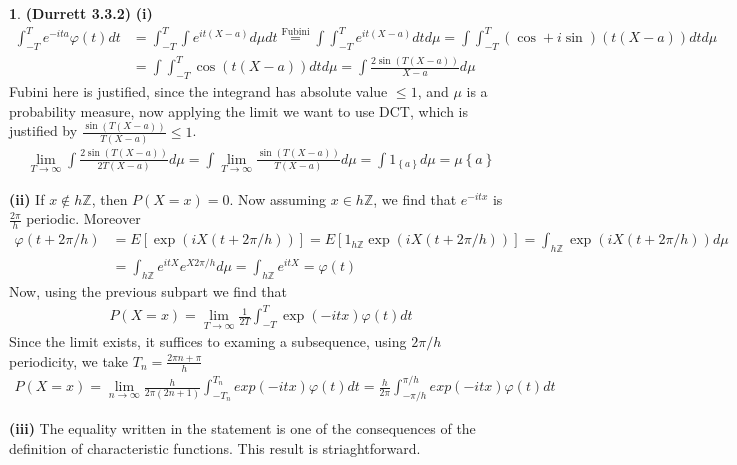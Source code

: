 \documentclass{article}
\theoremstyle{definition}
\newtheorem{pb}{}
\newcommand{\set}[1]{\left\{#1\right\}}
\begin{document}
    \begin{pb}\textbf{(Durrett 3.3.2)} \textbf{(i)}
        \begin{align*}
            \int_{-T}^T e^{-ita}\varphi(t)dt &= \int_{-T}^T \int e^{it(X-a)}d\mu dt \overset{\text{Fubini}}{=} \int\int_{-T}^T e^{it(X-a)}dtd\mu = \int\int_{-T}^T (\cos + i\sin)(t(X-a))dtd\mu \\
            &= \int\int_{-T}^T \cos(t(X-a))dtd\mu = \int \frac{2\sin(T(X-a))}{X-a}d\mu
        \end{align*}
        Fubini here is justified, since the integrand has absolute value \(\leq 1\), and \(\mu\) is a probability measure, now applying the limit we want to use DCT, which is justified by \(\frac{\sin(T(X-a))}{T(X-a)} \leq 1\).
        \begin{align*}
            \lim_{T \to \infty}\int\frac{2\sin(T(X-a))}{2T(X-a)}d\mu = \int\lim_{T\to\infty}\frac{\sin(T(X-a))}{T(X-a)}d\mu = \int1_{\set{a}}d\mu = \mu\set{a}
        \end{align*}

        \textbf{(ii)} If \(x \not \in h \mathbb{Z}\), then \(P(X = x) = 0\). Now assuming \(x \in h \mathbb{Z}\), we find that \(e^{-i t x}\) is \(\frac{2\pi}{h}\) periodic. Moreover
        \begin{align*}
            \varphi(t + 2\pi/h) &= E[\exp(iX(t + 2\pi/h))] = E[1_{h \mathbb{Z}}\exp(iX(t + 2\pi/h))] = \int_{h \mathbb{Z}}\exp(iX(t + 2\pi/h)) d\mu \\
            &= \int_{h \mathbb{Z}}e^{itX}e^{X2\pi/h}d\mu = \int_{h \mathbb{Z}} e^{itX} = \varphi(t)
        \end{align*}
        Now, using the previous subpart we find that
        \begin{align*}
            P(X = x) = \lim_{T \to \infty} \frac{1}{2T}\int_{-T}^T \exp(-i tx)\varphi(t)dt
        \end{align*}
        Since the limit exists, it suffices to examing a subsequence, using \(2\pi/h\) periodicity, we take \(T_n = \frac{2\pi n + \pi}{h}\)
        \begin{align*}
            P(X = x) = \lim_{n\to\infty} \frac{h}{2\pi(2n+1)}\int_{-T_n}^{T_n} exp(-i tx)\varphi(t)dt = \frac{h}{2\pi}\int_{-\pi/h}^{\pi/h} exp(-i tx)\varphi(t)dt
        \end{align*}

        \textbf{(iii)} The equality written in the statement is one of the consequences of the definition of characteristic functions. This result is striaghtforward.
    \end{pb}
\end{document}
